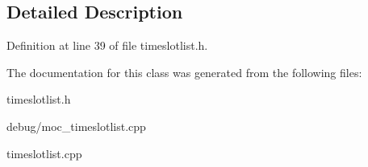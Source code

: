 \subsection{Detailed Description}


Definition at line 39 of file timeslotlist.\+h.



The documentation for this class was generated from the following files\+:\begin{DoxyCompactItemize}
\item 
timeslotlist.\+h\item 
debug/moc\+\_\+timeslotlist.\+cpp\item 
timeslotlist.\+cpp\end{DoxyCompactItemize}
